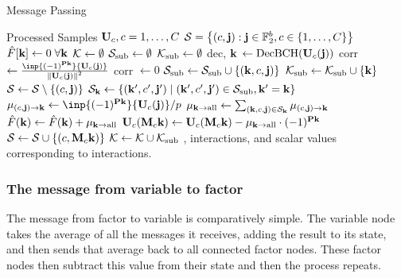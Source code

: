 \begin{algorithm}
   \caption{Message Passing}
   \label{alg:message-pass}
\begin{algorithmic}[1]
 Processed Samples  $\mathbf U_c, c=1, \dotsc, C$
\State $\mathcal S = \left\{ (c,\mathbf j): \mathbf j \in \mathbb F_2^b, c \in \{1, \dotsc, C\}\right\}$ 
\State $\hat{F}[\mathbf k] \gets 0 \;\forall\mathbf k$
\State $\mathcal K \gets \emptyset$
 
    \State $\mathcal S_{\text{sub}} \gets \emptyset$
    \State $\mathcal K_{\text{sub}} \gets \emptyset$
        \State dec, $\mathbf k$ $\gets \mathrm{DecBCH} (\mathbf U_c(\mathbf j))$ 
            \State corr $\gets \frac{\inp{(-1)^{\bP \bk}}{\bU_c(\bj)}}{\norm{\bU_c(\bj)}^2}$
        \Else
            \State corr $\gets 0$
        \EndIf
         
            \State $\mathcal S_{\text{sub}} \gets \mathcal S_{\text{sub}} \cup \{(\mathbf k, c, \mathbf j)\}$
            \State $\mathcal K_{\text{sub}} \gets \mathcal K_{\text{sub}} \cup \{\mathbf k\}$
        \Else
            \State $\mathcal S \gets \mathcal S \setminus \{ (c, \mathbf j)\}$ 
        \EndIf
    \EndFor
        \State $\mathcal S_{\mathbf k} \gets \{ (\mathbf k', c', \mathbf j') \mid (\mathbf k', c', \mathbf j') \in \mathcal S_{\text{sub}}, \mathbf k' = \mathbf k \}$
        \State $\mu_{(c,\bj) \rightarrow \bk} \gets \inp{(-1)^{\bP \bk}}
        {\bU_c(\bj)}/p$ 
        \State $\mu_{\mathbf k \rightarrow \text{all}} \gets \sum_{(\mathbf k, c, \mathbf j) \in \mathcal S_{\mathbf k}} \mu_{(c,\mathbf j) \rightarrow \mathbf k}$
        \State $\hat{F}(\mathbf k) \gets \hat{F}(\mathbf k) + \mu_{\mathbf k \rightarrow \text{all}}$ 
            \State $\mathbf U_c(\mathbf M_c \mathbf k) \gets \mathbf U_c(\mathbf M_c \mathbf k) - \mu_{\mathbf k \rightarrow \text{all}}\cdot(-1)^{\mathbf P \mathbf k}$ 
            \State $\mathcal S \gets \mathcal S \cup \{ (c, \mathbf M_c \mathbf k)\}$
        \EndFor
    \EndFor
    \State $\mathcal K \gets \mathcal K \cup \mathcal K_{\text{sub}}$
\EndWhile
  , interactions, and scalar values corresponding to interactions.
\end{algorithmic}
\end{algorithm}
\subsubsection{The message from variable to factor}
The message from factor to variable is comparatively simple. The variable node takes the average of all the messages it receives, adding the result to its state, and then sends that average back to all connected factor nodes. These factor nodes then subtract this value from their state and then the process repeats. 


